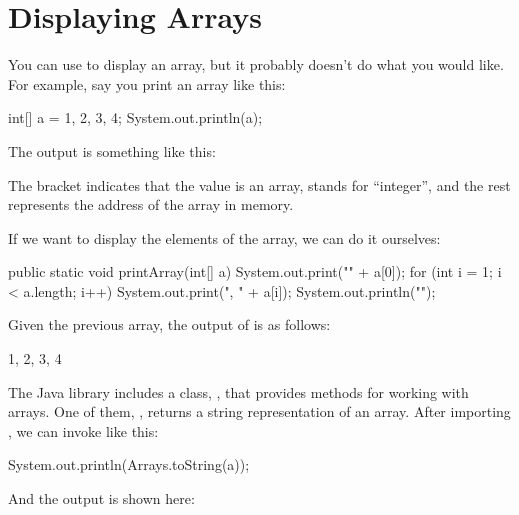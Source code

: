 \section{Displaying Arrays}
\label{printarray}


You can use  to display an array, but it probably doesn't do what you would like.
For example, say you print an array like this:

\begin{code}
int[] a = {1, 2, 3, 4};
System.out.println(a);
\end{code}

The output is something like this:

\begin{stdout}
[I@bf3f7e0
\end{stdout}

The bracket indicates that the value is an array,  stands for ``integer'', and the rest represents the address of the array in memory.

If we want to display the elements of the array, we can do it ourselves:


\begin{code}
public static void printArray(int[] a) {
    System.out.print("{" + a[0]);
    for (int i = 1; i < a.length; i++) {
        System.out.print(", " + a[i]);
    }
    System.out.println("}");
}
\end{code}

Given the previous array, the output of  is as follows:

\begin{stdout}
{1, 2, 3, 4}
\end{stdout}


The Java library includes a class, , that provides methods for working with arrays.
One of them, , returns a string representation of an array.
After importing , we can invoke  like this:

\begin{code}
System.out.println(Arrays.toString(a));
\end{code}

And the output is shown here:

\begin{stdout}
[1, 2, 3, 4]
\end{stdout}

